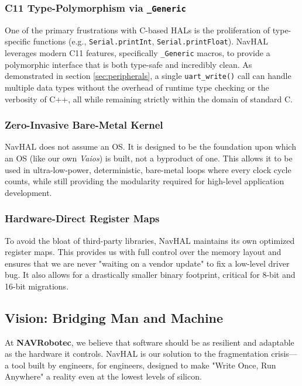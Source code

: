 \subsubsection{C11 Type-Polymorphism via \texttt{\_Generic}}
One of the primary frustrations with C-based HALs is the proliferation of type-specific functions (e.g., \texttt{Serial.printInt}, \texttt{Serial.printFloat}). NavHAL leverages modern C11 features, specifically \texttt{\_Generic} macros, to provide a polymorphic interface that is both type-safe and incredibly clean. As demonstrated in section \ref{sec:peripherals}, a single \texttt{uart\_write()} call can handle multiple data types without the overhead of runtime type checking or the verbosity of C++, all while remaining strictly within the domain of standard C.

\subsubsection{Zero-Invasive Bare-Metal Kernel}
NavHAL does not assume an OS. It is designed to be the foundation upon which an OS (like our own \textit{Vaios}) is built, not a byproduct of one. This allows it to be used in ultra-low-power, deterministic, bare-metal loops where every clock cycle counts, while still providing the modularity required for high-level application development.

\subsubsection{Hardware-Direct Register Maps}
To avoid the bloat of third-party libraries, NavHAL maintains its own optimized register maps. This provides us with full control over the memory layout and ensures that we are never "waiting on a vendor update" to fix a low-level driver bug. It also allows for a drastically smaller binary footprint, critical for 8-bit and 16-bit migrations.

\subsection{Vision: Bridging Man and Machine}
At \textbf{NAVRobotec}, we believe that software should be as resilient and adaptable as the hardware it controls. NavHAL is our solution to the fragmentation crisis---a tool built by engineers, for engineers, designed to make "Write Once, Run Anywhere" a reality even at the lowest levels of silicon.
